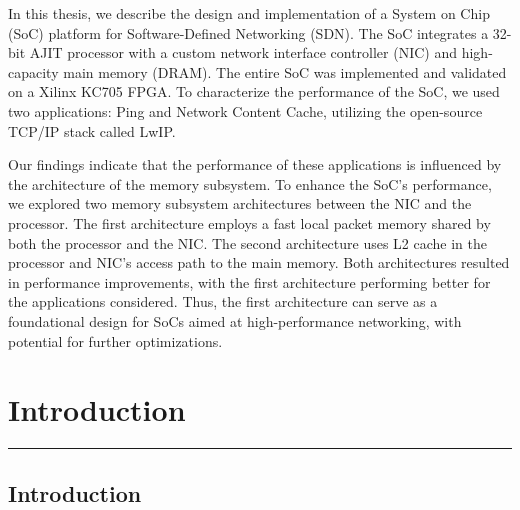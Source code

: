\documentclass[12pt]{report}
\begin{document}
In this thesis, we describe the design and implementation of a System on Chip (SoC) platform for Software-Defined Networking (SDN). The SoC integrates a 32-bit AJIT processor with a custom network interface controller (NIC) and high-capacity main memory (DRAM). The entire SoC was implemented and validated on a Xilinx KC705 FPGA. To characterize the performance of the SoC, we used two applications: Ping and Network Content Cache, utilizing the open-source TCP/IP stack called LwIP. 

Our findings indicate that the performance of these applications is influenced by the architecture of the memory subsystem. To enhance the SoC's performance, we explored two memory subsystem architectures between the NIC and the processor. The first architecture employs a fast local packet memory shared by both the processor and the NIC. The second architecture uses L2 cache in the processor and NIC's access path to the main memory. Both architectures resulted in performance improvements, with the first architecture performing better for the applications considered. Thus, the first architecture can serve as a foundational design for SoCs aimed at high-performance networking, with potential for further optimizations.\\
\par
 

\tableofcontents
\newpage
\listoffigures
\newpage
{}
\listoftables



\newpage

\clearpage




\chapter{Introduction} \label{1}
\rule[10pt]{\linewidth}{3pt}
 
\section{Introduction}
\end{document}
